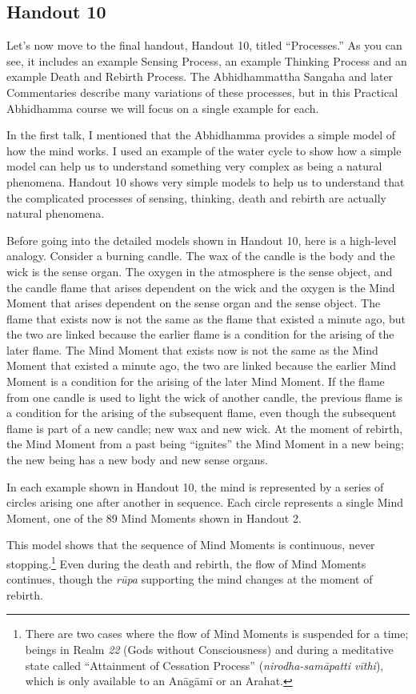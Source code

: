 \subsection*{Handout 10}

Let’s now move to the final handout, Handout 10, titled “Processes.” As you can see, it includes an example Sensing Process, an example Thinking Process and an example Death and Rebirth Process. The Abhidhammattha Sangaha and later Commentaries describe many variations of these processes, but in this Practical Abhidhamma course we will focus on a single example for each.

In the first talk, I mentioned that the Abhidhamma provides a simple model of how the mind works. I used an example of the water cycle to show how a simple model can help us to understand something very complex as being a natural phenomena. Handout 10 shows very simple models to help us to understand that the complicated processes of sensing, thinking, death and rebirth are actually natural phenomena.

Before going into the detailed models shown in Handout 10, here is a high-level analogy. Consider a burning candle. The wax of the candle is the body and the wick is the sense organ. The oxygen in the atmosphere is the sense object, and the candle flame that arises dependent on the wick and the oxygen is the Mind Moment that arises dependent on the sense organ and the sense object. The flame that exists now is not the same as the flame that existed a minute ago, but the two are linked because the earlier flame is a condition for the arising of the later flame. The Mind Moment that exists now is not the same as the Mind Moment that existed a minute ago, the two are linked because the earlier Mind Moment is a condition for the arising of the later Mind Moment. If the flame from one candle is used to light the wick of another candle, the previous flame is a condition for the arising of the subsequent flame, even though the subsequent flame is part of a new candle; new wax and new wick. At the moment of rebirth, the Mind Moment from a past being “ignites” the Mind Moment in a new being; the new being has a new body and new sense organs.

In each example shown in Handout 10, the mind is represented by a series of circles arising one after another in sequence. Each circle represents a single Mind Moment, one of the 89 Mind Moments shown in Handout 2.

This model shows that the sequence of Mind Moments is continuous, never stopping.\footnote{There are two cases where the flow of Mind Moments is suspended for a time; beings in Realm \textit{22} (Gods without Consciousness) and during a meditative state called “Attainment of Cessation Process” (\textit{nirodha-samāpatti vīthi}), which is only available to an Anāgāmī or an Arahat.} Even during the death and rebirth, the flow of Mind Moments continues, though the \textit{rūpa} supporting the mind changes at the moment of rebirth.

